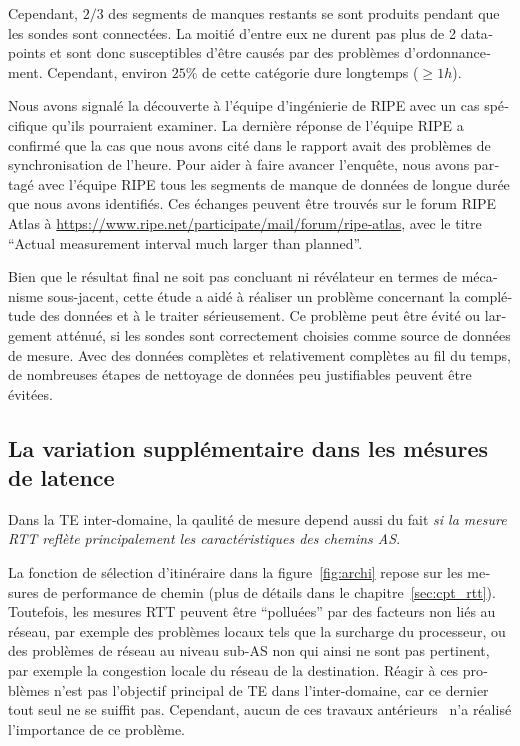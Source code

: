 \begin{otherlanguage}{french}
Cependant, $2/3$ des segments de manques restants se sont produits pendant que les sondes sont connectées.
La moitié d'entre eux ne durent pas plus de 2 datapoints et sont donc susceptibles d'être causés par des problèmes d'ordonnancement. 
Cependant, environ $25\%$ de cette catégorie dure longtemps ($\geq 1h$).

Nous avons signalé la découverte à l'équipe d'ingénierie de RIPE avec un cas spécifique qu'ils pourraient examiner.
La dernière réponse de l'équipe RIPE a confirmé que la cas que nous avons cité dans le rapport avait des problèmes de synchronisation de l'heure. 
Pour aider à faire avancer l'enquête, nous avons partagé avec l'équipe RIPE tous les segments de manque de données de longue durée que nous avons identifiés. 
Ces échanges peuvent être trouvés sur le forum RIPE Atlas à \url{https://www.ripe.net/participate/mail/forum/ripe-atlas}, avec le titre ``Actual measurement interval much larger than planned''.

Bien que le résultat final ne soit pas concluant ni révélateur en termes de mécanisme sous-jacent, cette étude a aidé à réaliser un problème concernant la complétude des données et à le traiter sérieusement.
Ce problème peut être évité ou largement atténué, si les sondes sont correctement choisies comme source de données de mesure.
Avec des données complètes et relativement complètes au fil du temps, de nombreuses étapes de nettoyage de données peu justifiables peuvent être évitées.

\subsection*{La variation supplémentaire dans les mésures de latence}

Dans la TE inter-domaine, la qaulité de mesure depend aussi du fait \textit{si la mesure RTT reflète principalement les caractéristiques des chemins AS}.

La fonction de sélection d'itinéraire dans la figure~\ref{fig:archi} repose sur les mesures de performance de chemin (plus de détails dans le chapitre~\ref{sec:cpt_rtt}).
Toutefois, les mesures RTT peuvent être ``polluées'' par des facteurs non liés au réseau, par exemple des problèmes locaux tels que la surcharge du processeur,
    ou des problèmes de réseau au niveau sub-AS non qui ainsi ne sont pas pertinent, par exemple la congestion locale du réseau de la destination.
Réagir à ces problèmes n'est pas l'objectif principal de TE dans l'inter-domaine, car ce dernier tout seul ne se suiffit pas.
Cependant, aucun de ces travaux antérieurs~\cite{Goldenberg2004, Akella2008} n'a réalisé l'importance de ce problème.


\end{otherlanguage}
